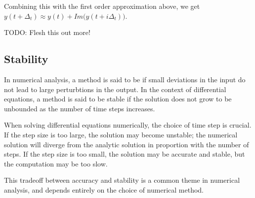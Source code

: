 \par Combining this with the first order approximation above, we get $y(t + \Delta_t) \approx y(t) + Im\big(y(t+i\Delta_t)\big)$.

TODO: Flesh this out more!

\subsection{Stability}
In numerical analysis, a method is said to be  if small deviations in the input do not lead to large perturbtions in the output.
In the context of differential equations, a method is said to be stable if the solution does not grow to be unbounded as the number of time steps increases.

When solving differential equations numerically, the choice of time step is crucial.
If the step size is too large, the solution may become unstable; the numerical solution will diverge from the analytic solution in proportion with the number of steps.
If the step size is too small, the solution may be accurate and stable, but the computation may be too slow.

This tradeoff between accuracy and stability is a common theme in numerical analysis, and depends entirely on the choice of numerical method.

